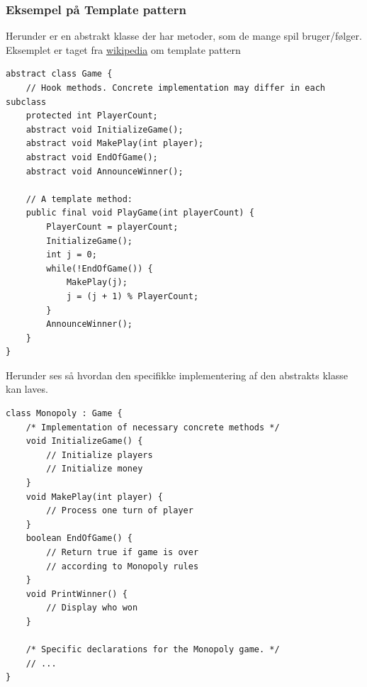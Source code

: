 \subsubsection{Eksempel på Template pattern}\label{sec:template}
Herunder er en abstrakt klasse der har metoder, som de mange spil bruger/følger. Eksemplet er taget fra \href{https://en.wikipedia.org/wiki/Template_method_pattern#Example_in_Java}{wikipedia} om template pattern

\begin{lstlisting}
abstract class Game {
	// Hook methods. Concrete implementation may differ in each subclass
	protected int PlayerCount;
	abstract void InitializeGame();
	abstract void MakePlay(int player);
	abstract void EndOfGame();
	abstract void AnnounceWinner();
	
	// A template method:
	public final void PlayGame(int playerCount)	{
		PlayerCount = playerCount;
		InitializeGame();
		int j = 0;
		while(!EndOfGame()) {
			MakePlay(j);
			j = (j + 1) % PlayerCount;
		}
		AnnounceWinner();
	}
}
\end{lstlisting}

Herunder ses så hvordan den specifikke implementering af den abstrakts klasse kan laves.

\begin{lstlisting}
class Monopoly : Game {
	/* Implementation of necessary concrete methods */
	void InitializeGame() {
		// Initialize players
		// Initialize money
	}
	void MakePlay(int player) {
		// Process one turn of player
	}
	boolean EndOfGame() {
		// Return true if game is over 
		// according to Monopoly rules
	}
	void PrintWinner() {
		// Display who won
	}
	
	/* Specific declarations for the Monopoly game. */
	// ...
}
\end{lstlisting}





